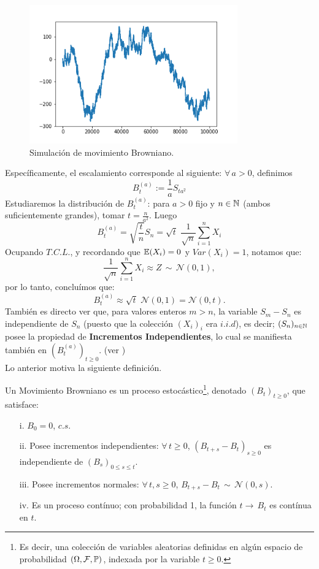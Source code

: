 \begin{figure}[H]
    \centering
    \includegraphics[width=0.8\textwidth]{browniano.png}
    \caption{Simulación de movimiento Browniano.}
    \label{MB}
\end{figure}

Específicamente, el escalamiento corresponde al siguiente: $\forall\, a>0$, definimos
\[B_t^{(a)}:= \frac{1}{a}S_{ta^2}\]
\newline Estudiaremos la distribución de $B_t^{(a)}$: para $a>0$ fijo y $n\in \mathbb N$ (ambos suficientemente grandes), tomar $t=\frac{n}{a^2}$. Luego
\[B_t^{(a)} = \sqrt{\frac{t}{n}}S_n = \sqrt{t}\,\, \frac{1}{\sqrt{n}}\sum_{i=1}^n X_i\]
Ocupando $T.C.L.$, y recordando que $\mathbb E(X_i)=0$ y $Var(X_i)=1$, notamos que:
\[\frac{1}{\sqrt{n}}\sum_{i=1}^n X_i \approx Z\,\sim\,\mathcal{N}(0,1), \]
por lo tanto, concluímos que:
\[B_t^{(a)} \approx \sqrt{t}\,\,\mathcal{N}(0,1) = \mathcal{N}(0,t).\]
También es directo ver que, para valores enteros $m>n$, la variable $S_m-S_n$ es independiente de $S_n$ (puesto que la colección $(X_i)_i$ era $i.i.d$), es decir; $(S_n)_{n\in\mathbb N}$ posee la propiedad de \textbf{Incrementos Independientes}, lo cual se manifiesta también en $(B_t^{(a)})_{t\geq 0}$. (ver \cite[cap. 2]{Kara})\\ \newline
Lo anterior motiva la siguiente definición.

\begin{definicion} Un Movimiento Browniano es un proceso estocástico\footnote{Es decir, una colección de variables aleatorias definidas en algún espacio de probabilidad $(\Omega,\mathcal{F},\mathbb{P})$, indexada por la variable $t\geq 0$.}, denotado $(B_t)_{t\geq 0}$, que satisface:
\begin{enumerate}
    \item[i.] $B_0 = 0$, $c.s.$
    \item[ii.] Posee incrementos independientes: $\forall\, t\geq 0$, $(B_{t+s}-B_t)_{s\geq 0}$ es independiente de $(B_s)_{0\leq s\leq t}$.
    \item[iii.] Posee incrementos normales: $\forall\, t,s\geq 0$, $B_{t+s}-B_{t}\,\sim\,\mathcal{N}(0,s)$.
    \item[iv.] Es un proceso contínuo; con probabilidad 1, la función $t\rightarrow\,B_t$ es contínua en $t$.
\end{enumerate}
\label{def-MB}
\end{definicion}

